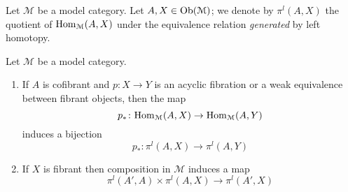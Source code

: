 \begin{refsection}
\begin{defin}
Let $\mathcal M$ be a model category. Let $A,X \in \operatorname{Ob}(\mathcal M)$; we denote by $\pi^l(A,X)$ the quotient of $\mathrm{Hom}_{\mathcal M}(A,X)$ under the equivalence relation \emph{generated} by left homotopy.
\end{defin}


\begin{lemma} \label{lemma homotopy category 2}
Let $\mathcal M$ be a model category. 
\begin{enumerate}
\item If $A$ is cofibrant and $p \colon X \to Y$ is an acyclic fibration or a weak equivalence between fibrant objects, then the map
\[
p_* \colon \mathrm{Hom}_{\mathcal M}(A,X) \to \mathrm{Hom}_{\mathcal M}(A,Y)
\]
induces a bijection
\[
p_* \colon \pi^l(A,X) \to \pi^l(A,Y)
\]

\item If $X$ is fibrant then composition in $\mathcal M$ induces a map
\[
\pi^l(A',A) \times \pi^l(A,X) \to \pi^l(A',X)
\]
\end{enumerate}
\end{lemma}



\end{refsection}
